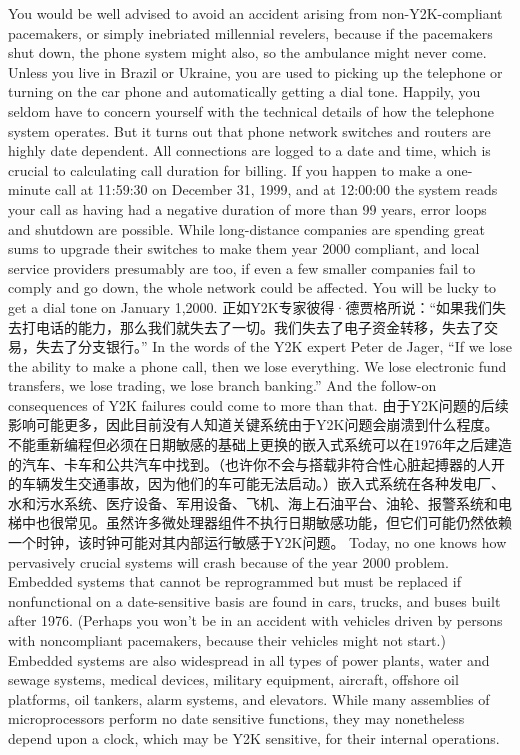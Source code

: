 \begin{paracol}{2}
\switchcolumn
You would be well advised to avoid an accident arising from non-Y2K-compliant pacemakers, or simply inebriated millennial revelers, because if the pacemakers shut down, the phone system might also, so the ambulance might never come. Unless you live in Brazil or Ukraine, you are used to picking up the telephone or turning on the car phone and automatically getting a dial tone. Happily, you seldom have to concern yourself with the technical details of how the telephone system operates. But it turns out that phone network switches and routers are highly date dependent. All connections are logged to a date and time, which is crucial to calculating call duration for billing. If you happen to make a one-minute call at 11:59:30 on December 31, 1999, and at 12:00:00 the system reads your call as having had a negative duration of more than 99 years, error loops and shutdown are possible. While long-distance companies are spending great sums to upgrade their switches to make them year 2000 compliant, and local service providers presumably are too, if even a few smaller companies fail to comply and go down, the whole network could be affected. You will be lucky to get a dial tone on January 1,2000.
\switchcolumn*
正如Y2K专家彼得·德贾格所说：“如果我们失去打电话的能力，那么我们就失去了一切。我们失去了电子资金转移，失去了交易，失去了分支银行。”
\switchcolumn
In the words of the Y2K expert Peter de Jager, ``If we lose the ability to make a phone call, then we lose everything. We lose electronic fund transfers, we lose trading, we lose branch banking.'' And the follow-on consequences of Y2K failures could come to more than that.
\switchcolumn*
由于Y2K问题的后续影响可能更多，因此目前没有人知道关键系统由于Y2K问题会崩溃到什么程度。不能重新编程但必须在日期敏感的基础上更换的嵌入式系统可以在1976年之后建造的汽车、卡车和公共汽车中找到。（也许你不会与搭载非符合性心脏起搏器的人开的车辆发生交通事故，因为他们的车可能无法启动。）嵌入式系统在各种发电厂、水和污水系统、医疗设备、军用设备、飞机、海上石油平台、油轮、报警系统和电梯中也很常见。虽然许多微处理器组件不执行日期敏感功能，但它们可能仍然依赖一个时钟，该时钟可能对其内部运行敏感于Y2K问题。
\switchcolumn
Today, no one knows how pervasively crucial systems will crash because of the year 2000 problem. Embedded systems that cannot be reprogrammed but must be replaced if nonfunctional on a date-sensitive basis are found in cars, trucks, and buses built after 1976. (Perhaps you won't be in an accident with vehicles driven by persons with noncompliant pacemakers, because their vehicles might not start.) Embedded systems are also widespread in all types of power plants, water and sewage systems, medical devices, military equipment, aircraft, offshore oil platforms, oil tankers, alarm systems, and elevators. While many assemblies of microprocessors perform no date sensitive functions, they may nonetheless depend upon a clock, which may be Y2K sensitive, for their internal operations.
\end{paracol}

